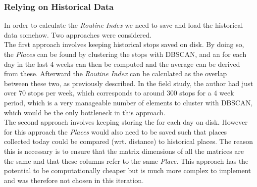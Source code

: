 \subsubsection*{Relying on Historical Data}
In order to calculate the \textit{Routine Index} we need to save and load the historical data somehow. Two approaches were considered.\\

The first approach involves keeping historical stops saved on disk. By doing so, the \textit{Places} can be found by clustering the stops with DBSCAN, and an  for each day in the last 4 weeks can then be computed and the average  can be derived from these. Afterward the \textit{Routine Index} can be calculated as the overlap between these two, as previously described. In the field study, the author had just over 70 stops per week, which corresponds to around 300 stops for a 4 week period, which is a very manageable number of elements to cluster with DBSCAN, which would be the only bottleneck in this approach.\\

The second approach involves keeping storing the  for each day on disk. However for this approach the \textit{Places} would also need to be saved such that places collected today could be compared (wrt. distance) to historical places. The reason this is necessary is to ensure that the matrix dimensions of all the matrices are the same and that these columns refer to the same \textit{Place}.  This approach has the potential to be computationally cheaper but is much more complex to implement and was therefore not chosen in this iteration.


